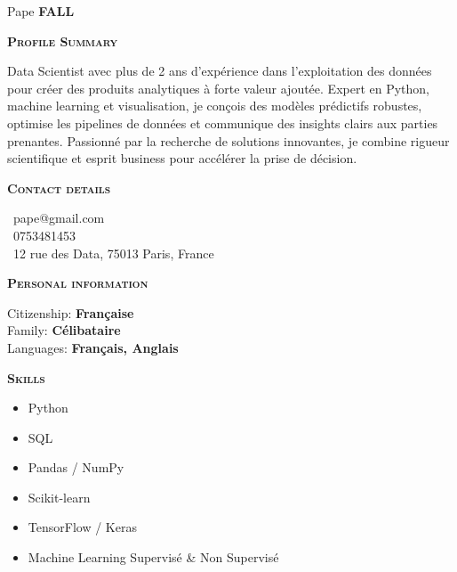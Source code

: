 \documentclass[11pt,a4paper]{article}
\newcommand{\headleft}[1]{\vspace*{3ex}\textsc{\textbf{#1}}\par%
    \vspace*{-1.5ex}\hrulefill\par\vspace*{0.7ex}}
\begin{document}
\setlength{\topskip}{0pt}\setlength{\parindent}{0pt}\setlength{\parskip}{0pt}
\setlength{\fboxsep}{0pt}\pagestyle{empty}\raggedbottom

\begin{minipage}[t]{0.33\textwidth}
\colorbox{cvblue}{\begin{minipage}[t][5mm][t]{\textwidth}\null\hfill\null\end{minipage}}
\vspace{-.2ex}
\colorbox{cvblue!90}{\color{white}
\textwidth
\begin{minipage}[t][293mm][t]{0.82\textwidth}\raggedright
\vspace*{2.5ex}

\Large Pape \textbf{\textsc{FALL}} \normalsize

\vspace*{0.5ex}

\headleft{Profile Summary}
Data Scientist avec plus de 2 ans d’expérience dans l’exploitation des données pour créer des produits analytiques à forte valeur ajoutée. Expert en Python, machine learning et visualisation, je conçois des modèles prédictifs robustes, optimise les pipelines de données et communique des insights clairs aux parties prenantes. Passionné par la recherche de solutions innovantes, je combine rigueur scientifique et esprit business pour accélérer la prise de décision.

\headleft{Contact details}\small
\MVAt\ {\small pape@gmail.com} \\[0.4ex]
\Mobilefone\ 0753481453 \\[0.5ex]
\Letter\ 12 rue des Data, 75013 Paris, France
\normalsize

\headleft{Personal information}
Citizenship: \textbf{Française} \\[0.5ex]
Family: \textbf{Célibataire} \\[0.5ex]
Languages: \textbf{Français, Anglais}

\headleft{Skills}
\begin{itemize}
  \item Python
  \item SQL
  \item Pandas / NumPy
  \item Scikit-learn
  \item TensorFlow / Keras
  \item Machine Learning Supervisé \& Non Supervisé
\end{itemize}

\end{minipage}\textwidth
}
\end{minipage}
\end{document}
